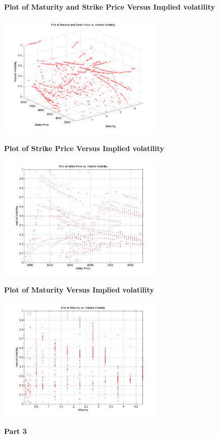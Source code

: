 \documentclass{article}
\begin{document}
\textbf{Plot of Maturity and Strike Price Versus Implied volatility}
\begin{center}
\includegraphics[width =80mm]{Lab9_Q2-Figure1}
\end{center}

\textbf{Plot of Strike Price Versus Implied volatility}
\begin{center}
\includegraphics[width =80mm]{Lab9_Q2-Figure2}
\end{center}

\textbf{Plot of Maturity Versus Implied volatility}
\begin{center}
\includegraphics[width =80mm]{Lab9_Q2-Figure3}
\end{center}

\textbf{Part 3}\\
\end{document}
